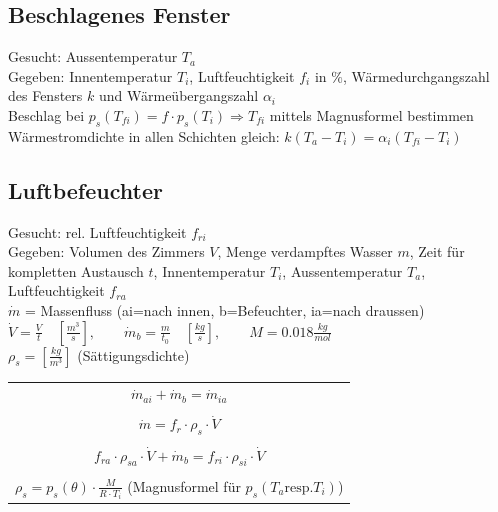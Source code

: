 \subsection{Beschlagenes Fenster}

Gesucht: Aussentemperatur $T_a$\\
Gegeben: Innentemperatur $T_i$, Luftfeuchtigkeit $f_i$ in $\%$, 
Wärmedurchgangszahl des Fensters $k$ und Wärmeübergangszahl $\alpha_i$\\

Beschlag bei $p_s(T_{fi}) = f \cdot p_s(T_i) \Rightarrow T_{fi} $ mittels Magnusformel bestimmen\\

Wärmestromdichte in allen Schichten gleich: $k(T_a - T_i) = \alpha_i(T_{fi} - T_i)$

\subsection{Luftbefeuchter}
Gesucht: rel. Luftfeuchtigkeit $f_{ri}$ \\
Gegeben: Volumen des Zimmers $V$, Menge verdampftes Wasser $m$, Zeit für kompletten Austausch $t$, Innentemperatur $T_i$, Aussentemperatur $T_a$, Luftfeuchtigkeit $f_{ra}$\\
$\dot{m}$ = Massenfluss (ai=nach innen, b=Befeuchter, ia=nach draussen)\\
$\dot{V} = \frac{V}{t} \quad [\frac{m^3}{s}] , \quad \quad \dot{m}_b = \frac{m}{t_0} \quad [\frac{kg}{s}], \quad \quad  M = \text{0.018} \frac{kg}{mol}$\\ 
$\rho_s = [\frac{kg}{m^3}]$ (Sättigungsdichte)

\begin{center}
    \begin{tabular}{c} 
    \\
    $ \dot{m}_{ai} + \dot{m}_b = \dot{m}_{ia} $ \\
    \\
    $ \dot{m} = f_r \cdot \rho_s \cdot \dot{V} $ \\
    \\
    $ f_{ra} \cdot \rho_{sa} \cdot \dot{V} + \dot{m}_b = f_{ri} \cdot \rho_{si} \cdot \dot{V} $ \\
    \\
    $ \rho_s = p_s (\theta) \cdot \frac{M}{R \cdot T_i} $ (Magnusformel für $p_s(T_a \text{resp.} T_i)$) \\
    \end{tabular}
\end{center}



